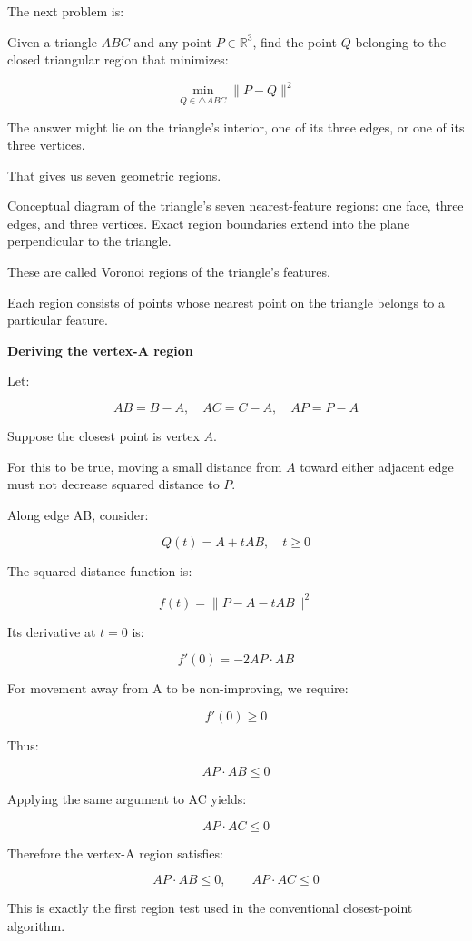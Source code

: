 The next problem is:

Given a triangle \(ABC\) and any point \(P\in\mathbb R^3\), find the point \(Q\) belonging to the closed triangular region that minimizes:

\[
\boxed{ \min_{Q\in\triangle ABC}\|P-Q\|^2 }
\]

The answer might lie on the triangle's interior, one of its three edges, or one of its three vertices.

That gives us seven geometric regions.

Conceptual diagram of the triangle's seven nearest-feature regions: one face, three edges, and three vertices. Exact region boundaries extend into the plane perpendicular to the triangle.

These are called Voronoi regions of the triangle's features.

Each region consists of points whose nearest point on the triangle belongs to a particular feature.

\textbf{Deriving the vertex-A region}

Let:

\[
AB=B-A,\quad AC=C-A,\quad AP=P-A
\]

Suppose the closest point is vertex \(A\).

For this to be true, moving a small distance from \(A\) toward either adjacent edge must not decrease squared distance to \(P\).

Along edge AB, consider:

\[
Q(t)=A+tAB,\quad t\ge0
\]

The squared distance function is:

\[
f(t)=\|P-A-tAB\|^2
\]

Its derivative at \(t=0\) is:

\[
f'(0)=-2AP\cdot AB
\]

For movement away from A to be non-improving, we require:

\[
f'(0)\ge0
\]

Thus:

\[
AP\cdot AB\le0
\]

Applying the same argument to AC yields:

\[
AP\cdot AC\le0
\]

Therefore the vertex-A region satisfies:

\[
\boxed{ AP\cdot AB\le0,\qquad AP\cdot AC\le0 }
\]

This is exactly the first region test used in the conventional closest-point algorithm.

